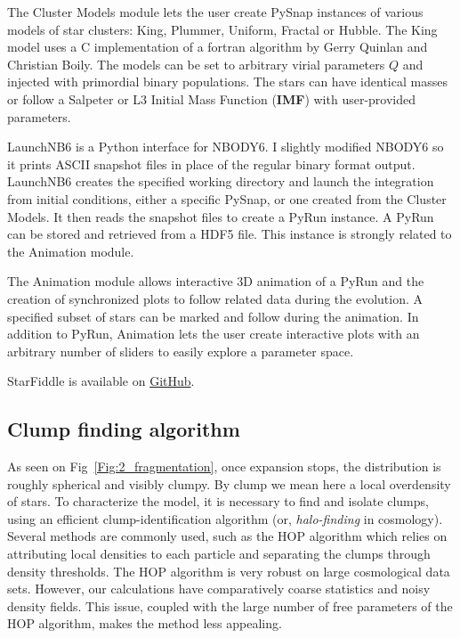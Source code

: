 The Cluster Models module lets the user create PySnap instances of various models of star clusters: King, Plummer, Uniform, Fractal or Hubble. The King model uses a C implementation of a fortran algorithm by Gerry Quinlan and Christian Boily. The models can be set to arbitrary virial parameters $Q$ and injected with primordial binary populations. The stars can have identical masses or follow a Salpeter or L3 Initial Mass Function (\textbf{IMF}) with user-provided parameters.

LaunchNB6 is a Python interface for NBODY6. I slightly modified NBODY6 so it prints ASCII snapshot files in place of the regular binary format output. LaunchNB6 creates the specified working directory and launch the integration from initial conditions, either a specific PySnap, or one created from the Cluster Models. It then reads the snapshot files to create a PyRun instance. A PyRun can be stored and retrieved from a HDF5 file. This instance is strongly related to the Animation module.

The Animation module allows interactive 3D animation of a PyRun and the creation of synchronized plots to follow related data during the evolution. A specified subset of stars can be marked and follow during the animation. In addition to PyRun, Animation lets the user create interactive plots with an arbitrary number of sliders to easily explore a parameter space.

StarFiddle is available on \href{https://github.com/dorvaljulien/StarFiddle}{GitHub}.












\subsection{Clump finding algorithm}

As seen on Fig~\ref{Fig:2_fragmentation}, once expansion stops, the distribution is roughly spherical and visibly clumpy. By clump we mean here a local overdensity of stars. To characterize the model, it is necessary to find and isolate clumps, using an efficient clump-identification algorithm (or, {\it halo-finding} in cosmology).  Several methods are commonly used, such as the HOP algorithm \citep{Eisenstein1998,Skory2010} which relies on attributing local densities to each particle and separating the clumps through density thresholds. The HOP algorithm is very robust on large cosmological data sets. However, our calculations have comparatively coarse statistics and noisy density fields. This issue, coupled with the  large number of free parameters of the HOP algorithm, makes the method less appealing. 

